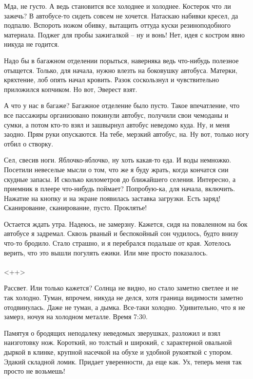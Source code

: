 \documentclass[a4paper]{book}
\begin{document}
Мда, не густо. А ведь становится все холоднее и холоднее. Костерок что ли зажечь? В автобусе-то сидеть совсем не хочется. Натаскаю набивки кресел, да подпалю. Вспороть ножом обивку, вытащить оттуда куски резиноподобного материала. Поджег для пробы зажигалкой -- ну и вонь! Нет, идея с костром явно никуда не годится. 

Надо бы в багажном отделении порыться, наверняка ведь что-нибудь полезное отыщется. Только, для начала, нужно влезть на боковушку автобуса. Матерки, кряхтение, лоб опять начал кровить. Разок соскользнул и чувствительно приложился копчиком. Но вот, Эверест взят. 

А что у нас в багаже? Багажное отделение было пусто. Такое впечатление, что все пассажиры организовано покинули автобус, получили свои чемоданы и сумки, а потом кто-то взял и зашвырнул автобус неведомо куда. Ну, и меня заодно. Прям руки опускаются. На тебе, мерзкий автобус, на. Ну вот, только ногу отбил о створку. 

Сел, свесив ноги. Яблочко-яблочко, ну хоть какая-то еда. И воды немножко. Посетили невеселые мысли о том, что же я буду жрать, когда кончатся сии скудные запасы. И сколько километров до ближайшего селения. Интересно, а приемник в плеере что-нибудь поймает? Попробую-ка, для начала, включить. Нажатие на кнопку и на экране появилась заставка загрузки. Есть заряд! Сканирование, сканирование, пусто. Проклятье! 

Остается ждать утра. Надеюсь, не замерзну. Кажется, сидя на поваленном на бок автобусе я задремал. Сквозь рваный и беспокойный сон чудилось, будто внизу что-то бродило. Стало страшно, и я перебрался подальше от края. Хотелось верить, что это вышли погулять ежики. Или мне просто показалось. 
\paragraph{}<++>


Рассвет. Или только кажется? Солнца не видно, но стало заметно светлее и не так холодно. Туман, впрочем, никуда не делся, хотя граница видимости заметно отодвинулась. Даже не туман, а дымка. Все-таки холодно. Удивительно, что я не замерз, ночуя на холодном металле. Время 7:30. 

Памятуя о бродящих неподалеку неведомых зверушках, разложил и взял наизготовку нож. Короткий, но толстый и широкий, с характерной овальной дыркой в клинке, крупной насечкой на обухе и удобной рукояткой с упором. Эдакий складной ломик. Придает уверенности, да еще как. Ух, теперь меня так просто не возьмешь!
\end{document}
